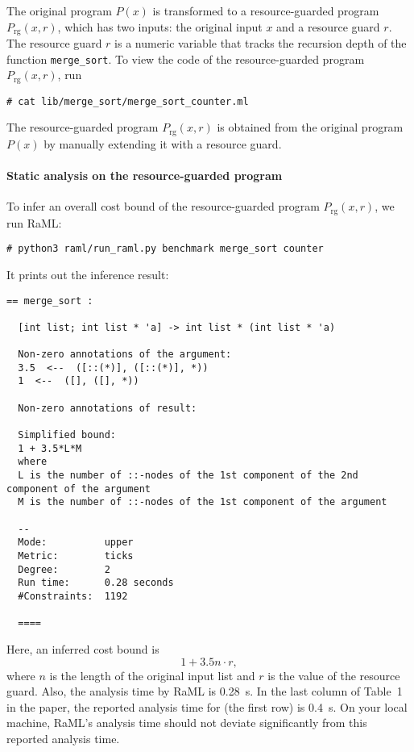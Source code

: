 The original program $P(x)$ is transformed to a resource-guarded program
$P_{\mathrm{rg}}(x, r)$, which has two inputs: the original input $x$ and a
resource guard $r$.
%
The resource guard $r$ is a numeric variable that tracks the recursion depth of
the function \texttt{merge\_sort}.
%
To view the code of the resource-guarded program $P_{\mathrm{rg}}(x, r)$, run
\begin{verbatim}
# cat lib/merge_sort/merge_sort_counter.ml
\end{verbatim}
%
The resource-guarded program $P_{\mathrm{rg}}(x, r)$ is obtained from the
original program $P(x)$ by manually extending it with a resource guard.

\paragraph{Static analysis on the resource-guarded program}

To infer an overall cost bound of the resource-guarded program
$P_{\mathrm{rg}}(x, r)$, we run RaML:
\begin{verbatim}
# python3 raml/run_raml.py benchmark merge_sort counter
\end{verbatim}
%
It prints out the inference result:
\begin{Verbatim}[fontsize=\footnotesize]
  == merge_sort :

  [int list; int list * 'a] -> int list * (int list * 'a)

  Non-zero annotations of the argument:
  3.5  <--  ([::(*)], ([::(*)], *))
  1  <--  ([], ([], *))

  Non-zero annotations of result:

  Simplified bound:
  1 + 3.5*L*M
  where
  L is the number of ::-nodes of the 1st component of the 2nd component of the argument
  M is the number of ::-nodes of the 1st component of the argument

  --
  Mode:          upper
  Metric:        ticks
  Degree:        2
  Run time:      0.28 seconds
  #Constraints:  1192

  ====
\end{Verbatim}
%
Here, an inferred cost bound is
\begin{equation}
  1 + 3.5 n \cdot r,
\end{equation}
where $n$ is the length of the original input list and $r$ is the value of the
resource guard.
%
Also, the analysis time by RaML is \qty{0.28}{\second}.
%
In the last column of Table~1 in the paper, the reported analysis time for
\mergesort{} (the first row) is \qty{0.4}{\second}.
%
On your local machine, RaML's analysis time should not deviate significantly
from this reported analysis time.


